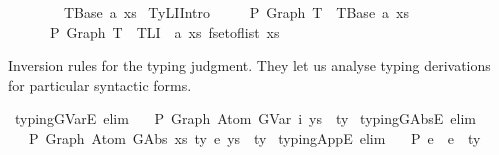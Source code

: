 \begin{isabellebody}
\ \ \ \ \ \ \ {\isacharcolon}{\kern0pt}\ TBase\ a\ xs{\isachardoublequoteclose}\isanewline
{\isacharbar}{\kern0pt}\ TyLIIntro{}{\isacharcolon}{\kern0pt}\isanewline
\ \ \ \ {\isachardoublequoteopen}{\isasymGamma}\ {\isasymturnstile}{\isacharbraceleft}{\kern0pt}P{\isacharbraceright}{\kern0pt}\ Graph\ T\ {\isacharcolon}{\kern0pt}\ TBase\ a\ xs\ {\isacharequal}{\kern0pt}{\isacharequal}{\kern0pt}{\isachargreater}{\kern0pt}\isanewline
\ \ \ \ \ {\isasymGamma}\ {\isasymturnstile}{\isacharbraceleft}{\kern0pt}P{\isacharbraceright}{\kern0pt}\ Graph\ T\ {\isacharcolon}{\kern0pt}\ TLI\ {}\ a\ xs\ {\isacharparenleft}{\kern0pt}fset{\isacharunderscore}{\kern0pt}of{\isacharunderscore}{\kern0pt}list\ xs{\isacharparenright}{\kern0pt}{\isachardoublequoteclose}%
\begin{isamarkuptext}%
Inversion rules for the typing judgment.
  They let us analyse typing derivations for particular syntactic forms.%
\end{isamarkuptext}\isamarkuptrue%
\isamarkupfalse%
\ typing{\isacharunderscore}{\kern0pt}GVarE\ {\isacharbrackleft}{\kern0pt}elim{\isacharbang}{\kern0pt}{\isacharbrackright}{\kern0pt}{\isacharcolon}{\kern0pt}\isanewline
\ \ {\isachardoublequoteopen}{\isasymGamma}\ {\isasymturnstile}{\isacharbraceleft}{\kern0pt}P{\isacharbraceright}{\kern0pt}\ Graph\ {\isacharparenleft}{\kern0pt}Atom\ {\isacharparenleft}{\kern0pt}GVar\ i{\isacharparenright}{\kern0pt}\ ys{\isacharparenright}{\kern0pt}\ {\isacharcolon}{\kern0pt}\ ty{\isachardoublequoteclose}\isanewline
\isanewline
{}\isamarkupfalse%
\ typing{\isacharunderscore}{\kern0pt}GAbsE\ {\isacharbrackleft}{\kern0pt}elim{\isacharbang}{\kern0pt}{\isacharbrackright}{\kern0pt}{\isacharcolon}{\kern0pt}\isanewline
\ \ {\isachardoublequoteopen}{\isasymGamma}\ {\isasymturnstile}{\isacharbraceleft}{\kern0pt}P{\isacharbraceright}{\kern0pt}\ Graph\ {\isacharparenleft}{\kern0pt}Atom\ {\isacharparenleft}{\kern0pt}GAbs\ xs\ ty{}\ e{\isacharparenright}{\kern0pt}\ ys{\isacharparenright}{\kern0pt}\ {\isacharcolon}{\kern0pt}\ ty{\isachardoublequoteclose}\isanewline
\isanewline
{}\isamarkupfalse%
\ typing{\isacharunderscore}{\kern0pt}AppE\ {\isacharbrackleft}{\kern0pt}elim{\isacharbang}{\kern0pt}{\isacharbrackright}{\kern0pt}{\isacharcolon}{\kern0pt}\isanewline
\ \ {\isachardoublequoteopen}{\isasymGamma}\ {\isasymturnstile}{\isacharbraceleft}{\kern0pt}P{\isacharbraceright}{\kern0pt}\ e{}\ {\isasymcdot}\ e{}\ {\isacharcolon}{\kern0pt}\ ty{\isachardoublequoteclose}\isanewline

\end{isabellebody}
